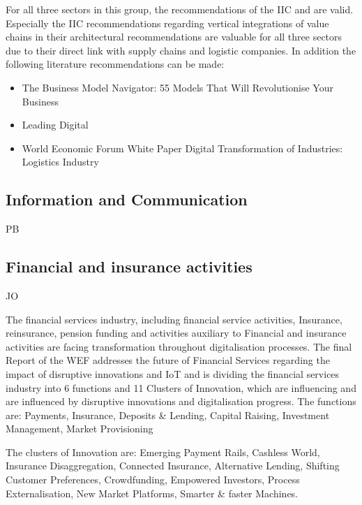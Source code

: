 For all three sectors in this group, the recommendations of the \ac{IIC} and \cite{I4.0Init} are valid. Especially the \ac{IIC} recommendations regarding vertical integrations of value chains in their architectural recommendations \cite{iicarchitecture:2016} are valuable for all three sectors due to their direct link with supply chains and logistic companies. In addition the following literature recommendations can be made:

\begin{itemize}
    \item The Business Model Navigator: 55 Models That Will Revolutionise Your Business \cite{gassmann2013geschaeftsmodelle}
    \item Leading Digital \cite{Leading Digital: Turning Technology Into Business Transformation}
    \item World Economic Forum White Paper Digital Transformation of Industries: Logistics Industry \cite{worldforumlogistics:2016}
\end{itemize}

\subsection{Information and Communication}
PB

\subsection{Financial and insurance activities}
JO

The financial services industry, including financial service activities, Insurance, reinsurance, pension funding and activities auxiliary to Financial and insurance activities \citeauthor{ISIC:2008} are facing transformation throughout digitalisation processes. The final Report of the \ac{WEF} addresses the future of Financial Services regarding the impact of disruptive innovations and \ac{IoT} \citeauthor{WEF-futureFinancialServices} and is dividing the financial services industry into 6 functions and 11 Clusters of Innovation, which are influencing and are influenced by disruptive innovations and digitalisation progress.
The functions are:
Payments, Insurance, Deposits \& Lending, Capital Raising, Investment Management, Market Provisioning

The clusters of Innovation are:
Emerging Payment Rails, Cashless World, Insurance Disaggregation, Connected Insurance, Alternative Lending, Shifting Customer Preferences, Crowdfunding, Empowered Investors, Process Externalisation, New Market Platforms, Smarter \& faster Machines.

